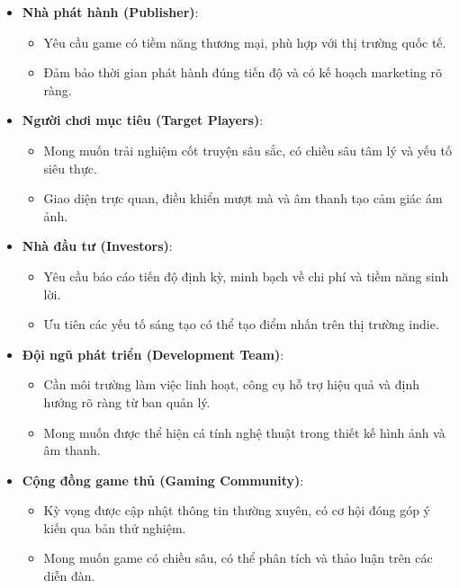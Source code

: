 \begin{itemize}
    \item \textbf{Nhà phát hành (Publisher)}: 
    \begin{itemize}
        \item Yêu cầu game có tiềm năng thương mại, phù hợp với thị trường quốc tế.
        \item Đảm bảo thời gian phát hành đúng tiến độ và có kế hoạch marketing rõ ràng.
    \end{itemize}

    \item \textbf{Người chơi mục tiêu (Target Players)}:
    \begin{itemize}
        \item Mong muốn trải nghiệm cốt truyện sâu sắc, có chiều sâu tâm lý và yếu tố siêu thực.
        \item Giao diện trực quan, điều khiển mượt mà và âm thanh tạo cảm giác ám ảnh.
    \end{itemize}

    \item \textbf{Nhà đầu tư (Investors)}:
    \begin{itemize}
        \item Yêu cầu báo cáo tiến độ định kỳ, minh bạch về chi phí và tiềm năng sinh lời.
        \item Ưu tiên các yếu tố sáng tạo có thể tạo điểm nhấn trên thị trường indie.
    \end{itemize}

    \item \textbf{Đội ngũ phát triển (Development Team)}:
    \begin{itemize}
        \item Cần môi trường làm việc linh hoạt, công cụ hỗ trợ hiệu quả và định hướng rõ ràng từ ban quản lý.
        \item Mong muốn được thể hiện cá tính nghệ thuật trong thiết kế hình ảnh và âm thanh.
    \end{itemize}

    \item \textbf{Cộng đồng game thủ (Gaming Community)}:
    \begin{itemize}
        \item Kỳ vọng được cập nhật thông tin thường xuyên, có cơ hội đóng góp ý kiến qua bản thử nghiệm.
        \item Mong muốn game có chiều sâu, có thể phân tích và thảo luận trên các diễn đàn.
    \end{itemize}

    
\end{itemize}
